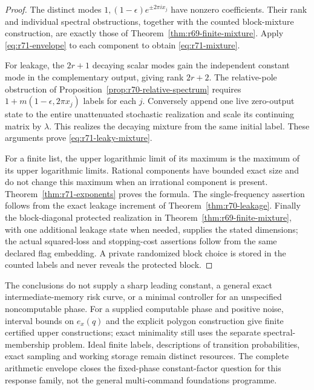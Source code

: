 \begin{proof}
The distinct modes $1,(1-\epsilon)e^{\pm2\pi ix_j}$ have nonzero coefficients. Their rank and individual spectral obstructions, together with the counted block-mixture construction, are exactly those of Theorem~\ref{thm:r69-finite-mixture}. Apply \eqref{eq:r71-envelope} to each component to obtain \eqref{eq:r71-mixture}.

For leakage, the $2r+1$ decaying scalar modes gain the independent constant mode in the complementary output, giving rank $2r+2$. The relative-pole obstruction of Proposition~\ref{prop:r70-relative-spectrum} requires $1+m(1-\epsilon,2\pi x_j)$ labels for each $j$. Conversely append one live zero-output state to the entire unattenuated stochastic realization and scale its continuing matrix by $\lambda$. This realizes the decaying mixture from the same initial label. These arguments prove \eqref{eq:r71-leaky-mixture}.

For a finite list, the upper logarithmic limit of its maximum is the maximum of its upper logarithmic limits. Rational components have bounded exact size and do not change this maximum when an irrational component is present. Theorem~\ref{thm:r71-exponents} proves the formula. The single-frequency assertion follows from the exact leakage increment of Theorem~\ref{thm:r70-leakage}. Finally the block-diagonal protected realization in Theorem~\ref{thm:r69-finite-mixture}, with one additional leakage state when needed, supplies the stated dimensions; the actual squared-loss and stopping-cost assertions follow from the same declared flag embedding. A private randomized block choice is stored in the counted labels and never reveals the protected block.
\end{proof}

The conclusions do not supply a sharp leading constant, a general exact intermediate-memory risk curve, or a minimal controller for an unspecified noncomputable phase. For a supplied computable phase and positive noise, interval bounds on $e_x(q)$ and the explicit polygon construction give finite certified upper constructions; exact minimality still uses the separate spectral-membership problem. Ideal finite labels, descriptions of transition probabilities, exact sampling and working storage remain distinct resources. The complete arithmetic envelope closes the fixed-phase constant-factor question for this response family, not the general multi-command foundations programme.
